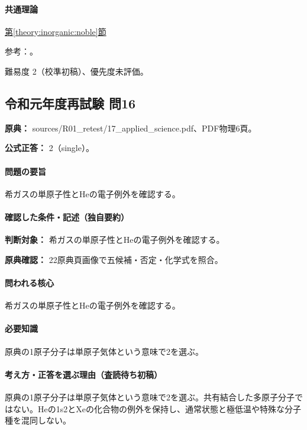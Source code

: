 \paragraph{共通理論} \hyperref[theory:inorganic:noble]{第\ref*{theory:inorganic:noble}節}

\par 参考：\cite{inorganic_noble_ref}。

\par 難易度 2（校準初稿）、優先度未評価。

\subsection{令和元年度再試験 問16}
\label{q:r01-ret-applied-16}

\noindent\textbf{原典：} sources/R01\_retest/17\_applied\_science.pdf、PDF物理6頁。

\textbf{公式正答：} 2（single）。

\paragraph{問題の要旨} 希ガスの単原子性とHeの電子例外を確認する。

\paragraph{確認した条件・記述（独自要約）}\mbox{}\par

\noindent\textbf{判断対象：} 希ガスの単原子性とHeの電子例外を確認する。\par

\noindent\textbf{原典確認：} 22原典頁画像で五候補・否定・化学式を照合。\par

\paragraph{問われる核心} 希ガスの単原子性とHeの電子例外を確認する。

\paragraph{必要知識} 原典の1原子分子は単原子気体という意味で2を選ぶ。

\paragraph{考え方・正答を選ぶ理由（査読待ち初稿）} 原典の1原子分子は単原子気体という意味で2を選ぶ。共有結合した多原子分子ではない。Heの1s2とXeの化合物の例外を保持し、通常状態と極低温や特殊な分子種を混同しない。


